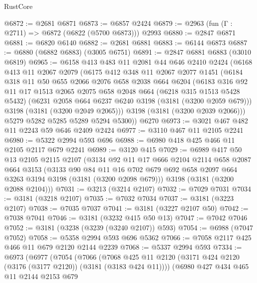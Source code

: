 \begin{lexlean}{RustCore}
\begin{coremodule}
@6872 := @2681 @6871
@6873 := @6857 @2424
@6879 := @2963 (fun (Γ : @2711) => @6872 (@6822 (@5700 @6873))) @2993
@6880 := @2847 @6871
@6881 := @6820 @6140
@6882 := @2681 @6881
@6883 := @6144 @6873
@6887 := @6880 (@6882 @6883) (@3005 @6751)
@6891 := @2847 @6881 @6883 (@3010 @6819)
@6965 := @6158
    @413
    @483
    @11
    @2081
    @44
    @646
    @2410
    @2424
    (@6168
      @413
      @11
      @2067
      @2079
      (@6175
        @412
        @348
        @11
        @2067
        @2077
        @1451
        (@6184
          @318
          @11
          @50
          @655
          @2066
          @2076
          @658
          @2038
          @664
          @6204
          (@6183
            @316
            @92
            @11
            @17
            @1513
            @2065
            @2075
            @658
            @2048
            @664
            (@6218 @315 @1513 @5428 @5432)
            (@6231 @2058 @664 @6237 @6240 @3198 (@3181 (@3200 @2059 @679)))
            @3198
            (@3181 (@3200 @2049 @2065)))
          @3198
          (@3181 (@3200 @2039 @2066)))
        @5279
        @5282
        @5285
        @5289
        @5294
        @5300))
    @6270
@6973 := @3021 @467 @482 @11 @2243 @59 @646 @2409 @2424
@6977 := @3110 @467 @11 @2105 @2241
@6980 := @5322 @2994 @593 @696
@6988 := @6980 @418 @425 @466 @11 @2105 @2117 @679 @2241
@6989 := @3120 @415
@7029 := @6989
    @417
    @50
    @13
    @2105
    @2115
    @2107
    (@3134
      @92
      @11
      @17
      @666
      @2104
      @2114
      @658
      @2087
      @664
      @3153
      (@3133
        @90
        @84
        @11
        @16
        @702
        @679
        @692
        @658
        @2097
        @664
        @3263
        @3194
        @3198
        (@3181 (@3200 @2098 @679)))
      @3198
      (@3181 (@3200 @2088 @2104)))
@7031 := @3213 (@3214 @2107)
@7032 := @7029 @7031
@7034 := @3181 (@3218 @2107)
@7035 := @7032 @7034
@7037 := @3181 (@3223 @2107)
@7038 := @7035 @7037
@7041 := @3181 (@3227 @2107 @50)
@7042 := @7038 @7041
@7046 := @3181 (@3232 @415 @50 @13)
@7047 := @7042 @7046
@7052 := @3181 (@3238 (@3239 (@3240 @2107)) @593)
@7054 := @6988 (@7047 @7052)
@7058 := @5358 @2994 @593 @696 @5362
@7066 := @7058 @2117 @425 @466 @11 @679 @2120 @2144 @2239
@7068 := @5337 @2994 @593
@7334 := @6973
    (@6977
      (@7054
        (@7066
          (@7068 @425 @11 @2120 (@3171 @424 @2120 (@3176 (@3177 @2120)) (@3181 (@3183 @424 @11))))
          (@6980
            @427
            @434
            @465
            @11
            @2144
            @2153
            @679

\end{coremodule}
\end{lexlean}
